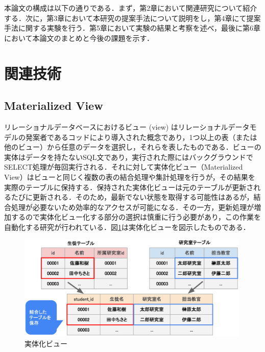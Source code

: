 \documentclass[uplatex]{deimj}
\begin{document}
  本論文の構成は以下の通りである．まず，第2章において関連研究について紹介する．次に，第3章において本研究の提案手法について説明をし，第4章にて提案手法に関する実験を行う．第5章において実験の結果と考察を述べ，最後に第6章において本論文のまとめと今後の課題を示す．

\section{関連技術}
\subsection{Materialized View}
  リレーショナルデータベースにおけるビュー (view) はリレーショナルデータモデルの発案者であるコッドにより導入された概念であり\cite{Codd1974}，1つ以上の表（または他のビュー）から任意のデータを選択し，それらを表したものである．ビューの実体はデータを持たないSQL文であり，実行された際にはバックグラウンドでSELECT処理が毎回実行される．それに対して実体化ビュー（Materialized View）はビューと同じく複数の表の結合処理や集計処理を行うが，その結果を実際のテーブルに保持する．保持された実体化ビューは元のテーブルが更新されるたびに更新される．そのため，最新でない状態を取得する可能性はあるが，結合処理が必要ないため効率的なアクセスが可能になる．その一方，更新処理が増加するので実体化ビュー化する部分の選択は慎重に行う必要があり，この作業を自動化する研究が行われている\cite{Hoshi2001}．図\ref{MvDescription}は実体化ビューを図示したものである．
  \begin{figure}[h]
    \includegraphics[width=30em, trim=0 5em 0 5em]{src/MvDescription.eps}
    \caption{実体化ビュー}
    \label{MvDescription}
  \end{figure}
\end{document}

